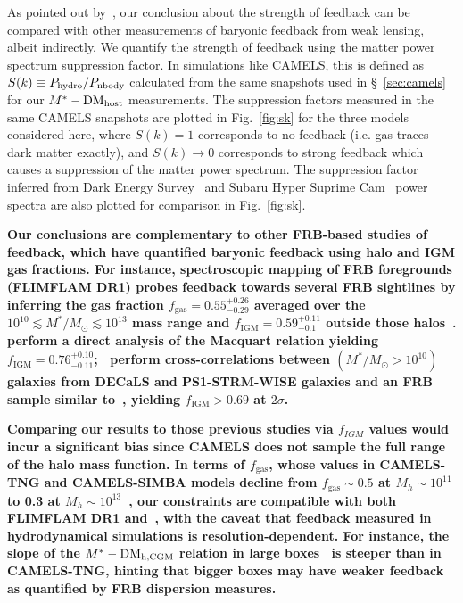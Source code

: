 \documentclass[twocolumn,linenumbers]{aastex631}
\newcommand{\msbold}[1]{\textbf{#1}}
\newcommand{\dmh}{\ensuremath{{\rm DM}_\textrm{host}}}
\newcommand{\dmhcgm}{\ensuremath{{\rm DM}_\textrm{h,CGM}}}
\begin{document}
As pointed out by~\citet{medlock2025constraining}, our conclusion about the strength of feedback can be compared with other measurements of baryonic feedback from weak lensing, albeit indirectly. 
We quantify the strength of feedback using the matter power spectrum suppression factor. 
In simulations like CAMELS, this is defined as $S(k) \equiv P_{\rm hydro}/P_{\rm nbody}$ calculated from the same snapshots used in \S~\ref{sec:camels} for our $M^*-\dmh$ measurements. The suppression factors measured in the same CAMELS snapshots are plotted in Fig.~\ref{fig:sk} for the three models considered here, where $S(k) = 1$ corresponds to no feedback (i.e. gas traces dark matter exactly), and $S(k) \to 0$ corresponds to strong feedback which causes a suppression of the matter power spectrum.
The suppression factor inferred from Dark Energy Survey~\citep{chen2023constraining} and Subaru Hyper Suprime Cam~\citep{terasawa2025exploring} power spectra are also plotted for comparison in Fig.~\ref{fig:sk}.

\msbold{Our conclusions are complementary to other FRB-based studies of feedback, which have quantified baryonic feedback using halo and IGM gas fractions. For instance, spectroscopic mapping of FRB foregrounds (FLIMFLAM DR1) probes feedback towards several FRB sightlines by inferring the gas fraction $f_\mathrm{gas} = 0.55^{+0.26}_{-0.29}$ averaged over the $10^{10} \lesssim M^*/M_\odot \lesssim 10^{13}$ mass range and $f_\mathrm{IGM} = 0.59^{+0.11}_{-0.1}$ outside those halos~\citep{lee2022constraining,khrykin2024flimflam}. \citet{connor2024gas} perform a direct analysis of the Macquart relation yielding $f_\mathrm{IGM} = 0.76^{+0.10}_{-0.11}$;~\citet{hussaini2025correlation} perform cross-correlations between $(M^*/M_\odot > 10^{10})$ galaxies from DECaLS and PS1-STRM-WISE galaxies and an FRB sample similar to~\citet{connor2024gas}, yielding $f_\mathrm{IGM} > 0.69$ at $2\sigma$.}

\msbold{Comparing our results to those previous studies via $f_{IGM}$ values would incur a significant bias since CAMELS does not sample the full range of the halo mass function. In terms of $f_\mathrm{gas}$, whose values in CAMELS-TNG and CAMELS-SIMBA models decline from $f_\mathrm{gas} \sim 0.5$ at $M_h \sim 10^{11}$ to 0.3 at $M_h \sim 10^{13}$~\citep{2025ApJ...980...61M}, our constraints are compatible with both FLIMFLAM DR1 and~\citet{connor2024gas}, with the caveat that feedback measured in hydrodynamical simulations is resolution-dependent. For instance, the slope of the $M^*-\dmhcgm$ relation in large boxes~\citep{mo2023dispersion} is steeper than in CAMELS-TNG, hinting that bigger boxes may have weaker feedback as quantified by FRB dispersion measures.}
\end{document}
